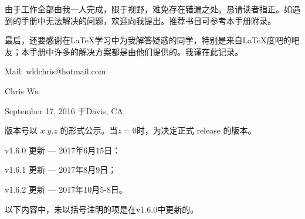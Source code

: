 由于工作全部由我一人完成，限于视野，难免存在错漏之处。恳请读者指正。如遇到的手册中无法解决的问题，欢迎向我提出。推荐书目可参考本手册附录。

最后，还要感谢在\LaTeX 学习中为我解答疑惑的同学，特别是来自\LaTeX 度吧的吧友；本手册中许多的解决方案都是由他们提供的。我谨在此记录。

\vfill

\begin{flushright}
Mail: wklchris@hotmail.com\dpar

Chris Wu

September 17, 2016 于Davis, CA
\end{flushright}
\clearpage
{}\dpar\dpar

版本号以 $x.y.z$ 的形式公示。当$z=0$时，为决定正式 release 的版本。

v1.6.0 更新 --- 2017年6月15日：

v1.6.1 更新 --- 2017年8月9日；

v1.6.2 更新 --- 2017年10月5-8日。\dpar

以下内容中，未以括号注明的项是在v1.6.0中更新的。

